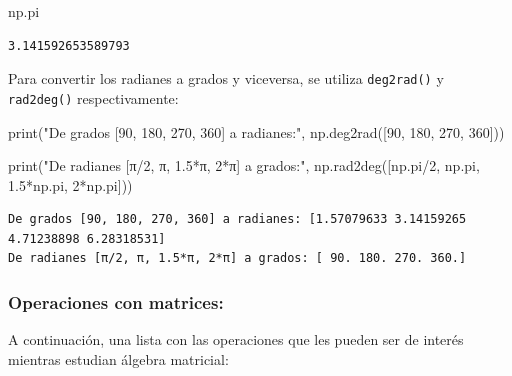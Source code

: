 \documentclass[
  letterpaper,
  DIV=11,
  numbers=noendperiod]{scrreprt}
\newenvironment{Shaded}{\begin{snugshade}}{\end{snugshade}}
\newcommand{\BuiltInTok}[1]{\textcolor[rgb]{0.00,0.23,0.31}{#1}}
\newcommand{\DecValTok}[1]{\textcolor[rgb]{0.68,0.00,0.00}{#1}}
\newcommand{\FloatTok}[1]{\textcolor[rgb]{0.68,0.00,0.00}{#1}}
\newcommand{\NormalTok}[1]{\textcolor[rgb]{0.00,0.23,0.31}{#1}}
\newcommand{\OperatorTok}[1]{\textcolor[rgb]{0.37,0.37,0.37}{#1}}
\newcommand{\StringTok}[1]{\textcolor[rgb]{0.13,0.47,0.30}{#1}}
\begin{document}
\begin{Shaded}
\begin{Highlighting}[]
\NormalTok{np.pi}
\end{Highlighting}
\end{Shaded}

\begin{verbatim}
3.141592653589793
\end{verbatim}

Para convertir los radianes a grados y viceversa, se utiliza
\texttt{deg2rad()} y \texttt{rad2deg()} respectivamente:

\begin{Shaded}
\begin{Highlighting}[]
\BuiltInTok{print}\NormalTok{(}\StringTok{"De grados [90, 180, 270, 360] a radianes:"}\NormalTok{, }
\NormalTok{      np.deg2rad([}\DecValTok{90}\NormalTok{, }\DecValTok{180}\NormalTok{, }\DecValTok{270}\NormalTok{, }\DecValTok{360}\NormalTok{]))}

\BuiltInTok{print}\NormalTok{(}\StringTok{"De radianes [π/2, π, 1.5*π, 2*π] a grados:"}\NormalTok{, }
\NormalTok{      np.rad2deg([np.pi}\OperatorTok{/}\DecValTok{2}\NormalTok{, np.pi, }\FloatTok{1.5}\OperatorTok{*}\NormalTok{np.pi, }\DecValTok{2}\OperatorTok{*}\NormalTok{np.pi]))}
\end{Highlighting}
\end{Shaded}

\begin{verbatim}
De grados [90, 180, 270, 360] a radianes: [1.57079633 3.14159265 4.71238898 6.28318531]
De radianes [π/2, π, 1.5*π, 2*π] a grados: [ 90. 180. 270. 360.]
\end{verbatim}

\subsubsection{Operaciones con
matrices:}\label{operaciones-con-matrices}

A continuación, una lista con las operaciones que les pueden ser de
interés mientras estudian álgebra matricial:
\end{document}
